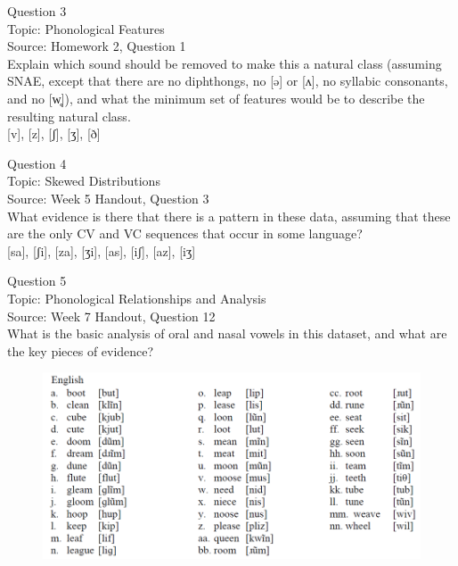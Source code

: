 \documentclass[12pt]{article}
\begin{document}
{\large Question 3}\\

Topic: Phonological Features\\
Source: Homework 2, Question 1\\

Explain which sound should be removed to make this a natural class (assuming SNAE, except that there are no diphthongs, no [ə] or [ʌ], no syllabic consonants, and no [w̥]), and what the minimum set of features would be to describe the resulting natural class.\\

{[v]}, {[z]}, {[ʃ]}, {[ʒ]}, {[ð]}


\newpage

{\large Question 4}\\

Topic: Skewed Distributions\\
Source: Week 5 Handout, Question 3\\

What evidence is there that there is a pattern in these data, assuming that these are the only CV and VC sequences that occur in some language?\\

{[sa]}, {[ʃi]}, {[za]}, {[ʒi]}, {[as]}, {[iʃ]}, {[az]}, {[iʒ]}


\newpage

{\large Question 5}\\

Topic: Phonological Relationships and Analysis\\
Source: Week 7 Handout, Question 12\\

What is the basic analysis of oral and nasal vowels in this dataset, and what are the key pieces of evidence?\\

\begin{figure}[H]
\includegraphics{../images/english12.png}
\end{figure}
\end{document}
